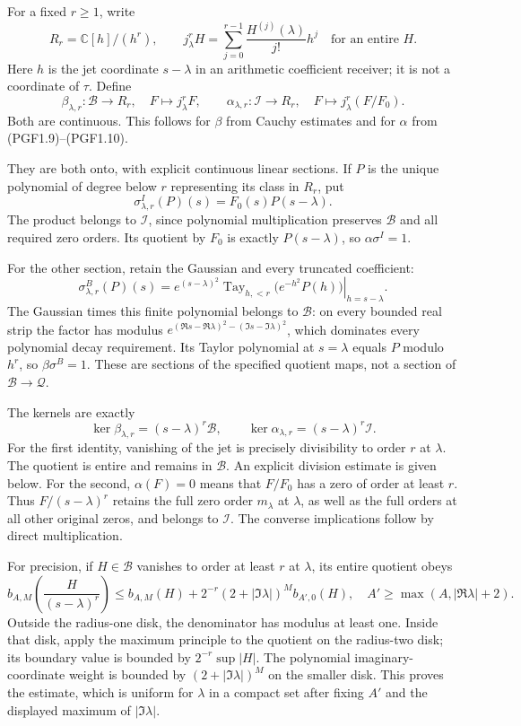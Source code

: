 For a fixed \(r\ge1\), write \[
R_r=\mathbb C[h]/(h^r),\qquad
j^r_\lambda H=\sum_{j=0}^{r-1}\frac{H^{(j)}(\lambda)}{j!}h^j
\quad\text{for an entire }H.
\tag{PGF2.1}
\] Here \(h\) is the jet coordinate \(s-\lambda\) in an arithmetic
coefficient receiver; it is not a coordinate of \(\tau\). Define \[
\beta_{\lambda,r}:\mathcal B\to R_r,
\quad F\mapsto j^r_\lambda F,
\qquad
\alpha_{\lambda,r}:\mathcal I\to R_r,
\quad F\mapsto j^r_\lambda(F/F_0).
\tag{PGF2.2}
\] Both are continuous. This follows for \(\beta\) from Cauchy estimates
and for \(\alpha\) from (PGF1.9)--(PGF1.10).

They are both onto, with explicit continuous linear sections. If \(P\)
is the unique polynomial of degree below \(r\) representing its class in
\(R_r\), put \[
\sigma^I_{\lambda,r}(P)(s)=F_0(s)P(s-\lambda).
\tag{PGF2.3}
\] The product belongs to \(\mathcal I\), since polynomial
multiplication preserves \(\mathcal B\) and all required zero orders.
Its quotient by \(F_0\) is exactly \(P(s-\lambda)\), so
\(\alpha\sigma^I=1\).

For the other section, retain the Gaussian and every truncated
coefficient: \[
\sigma^B_{\lambda,r}(P)(s)
=e^{(s-\lambda)^2}
\left.\operatorname{Tay}_{h,<r}\bigl(e^{-h^2}P(h)\bigr)
\right|_{h=s-\lambda}.
\tag{PGF2.4}
\] The Gaussian times this finite polynomial belongs to \(\mathcal B\):
on every bounded real strip the factor has modulus
\(e^{(\Re s-\Re\lambda)^2-(\Im s-\Im\lambda)^2}\), which dominates every
polynomial decay requirement. Its Taylor polynomial at \(s=\lambda\)
equals \(P\) modulo \(h^r\), so \(\beta\sigma^B=1\). These are sections
of the specified quotient maps, not a section of
\(\mathcal B\to\mathcal Q\).

The kernels are exactly \[
\ker\beta_{\lambda,r}=(s-\lambda)^r\mathcal B,
\qquad
\ker\alpha_{\lambda,r}=(s-\lambda)^r\mathcal I.
\tag{PGF2.5}
\] For the first identity, vanishing of the jet is precisely
divisibility to order \(r\) at \(\lambda\). The quotient is entire and
remains in \(\mathcal B\). An explicit division estimate is given below.
For the second, \(\alpha(F)=0\) means that \(F/F_0\) has a zero of order
at least \(r\). Thus \(F/(s-\lambda)^r\) retains the full zero order
\(m_\lambda\) at \(\lambda\), as well as the full orders at all other
original zeros, and belongs to \(\mathcal I\). The converse implications
follow by direct multiplication.

For precision, if \(H\in\mathcal B\) vanishes to order at least \(r\) at
\(\lambda\), its entire quotient obeys \[
b_{A,M}\!\left(\frac{H}{(s-\lambda)^r}\right)
\le b_{A,M}(H)
+2^{-r}(2+|\Im\lambda|)^M b_{A',0}(H),
\quad A'\ge\max(A,|\Re\lambda|+2).
\tag{PGF2.6}
\] Outside the radius-one disk, the denominator has modulus at least
one. Inside that disk, apply the maximum principle to the quotient on
the radius-two disk; its boundary value is bounded by \(2^{-r}\sup|H|\).
The polynomial imaginary-coordinate weight is bounded by
\((2+|\Im\lambda|)^M\) on the smaller disk. This proves the estimate,
which is uniform for \(\lambda\) in a compact set after fixing \(A'\)
and the displayed maximum of \(|\Im\lambda|\).

